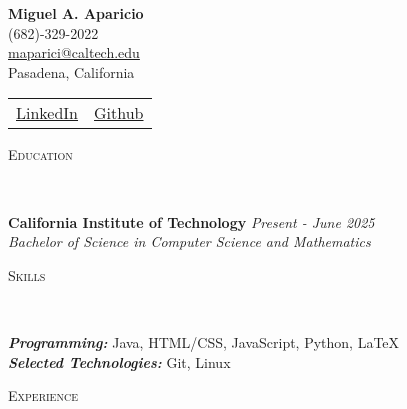 \documentclass[letterpaper,11pt]{article}
\newcommand{\lineover}{
	\begin{changemargin}{-0.05in}{-0.05in}
		\vspace*{-8pt}
		\hrulefill \\
		\vspace*{-2pt}
	\end{changemargin}
}
\newenvironment{changemargin}[2]{%
  \begin{list}{}{%
    \setlength{\topsep}{0pt}%
    \setlength{\leftmargin}{0}%
    \setlength{\rightmargin}{#2}%
    \setlength{\listparindent}{\parindent}%
    \setlength{\itemindent}{\parindent}%
    \setlength{\parsep}{\parskip}%
  }%
  \item[]}{\end{list}
}
\newcommand{\header}[1]{
	\begin{changemargin}{-0.5in}{-0.5in}
		\scshape{#1}\\
  	\lineover
	\end{changemargin}
}
\newenvironment{body} {
	\vspace*{-16pt}
	\begin{changemargin}{-0.25in}{-0.5in}
  }	
	{\end{changemargin}
}
\begin{document}
{\Large \textbf{Miguel A. Aparicio}} \\
(682)-329-2022 \\
\href{mailto:maparici@caltech.edu}{maparici@caltech.edu} \\
 Pasadena, California \\
 \begin{tabular}{l|l}
\href{https://www.linkedin.com/in/miguel-angel-aparicio-9a681a1a3/}{LinkedIn } & \href{https://github.com/jar0ch0}{ Github} 
\end{tabular}
\medskip

\header{Education}

\begin{body}
	\vspace{14pt}
	\textbf{California Institute of Technology} \hfill \emph{Present - June 2025} \\
	\emph{Bachelor of Science in Computer Science and Mathematics}\\
	
\end{body}

\medskip
\medskip

\header{Skills}

\begin{body}
	\vspace{14pt}
	\emph{\textbf{Programming:}}{} Java, HTML/CSS, JavaScript, Python, \LaTeX\\
	\medskip
	\emph{\textbf{Selected Technologies:}}{} Git, Linux\\
\end{body}

\medskip


\header{Experience}
\end{document}
